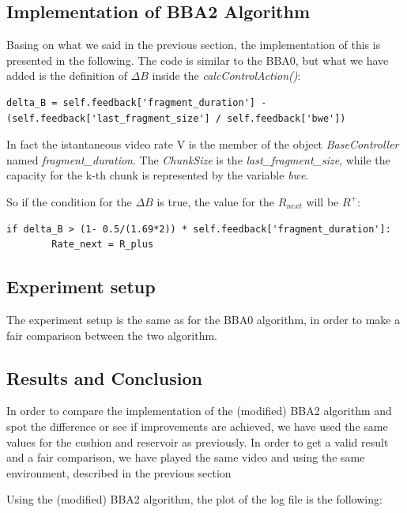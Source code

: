 \documentclass[a4paper]{report}
\begin{document}
\subsection{Implementation of BBA2 Algorithm}

Basing on what we said in the previous section, the implementation of this is presented in the following. 
The code is similar to the BBA0, but what we have added is the definition of $\Delta B$  inside the \textit{calcControlAction()}:

\begin{Verbatim}
delta_B = self.feedback['fragment_duration'] - (self.feedback['last_fragment_size'] / self.feedback['bwe'])
\end{Verbatim}

In fact the istantaneous video rate V is the member of the object \textit{BaseController} named \textit{fragment\_duration}. The \textit{ChunkSize} is the \textit{last\_fragment\_size}, while the capacity for the k-th chunk is represented by the variable \textit{bwe}.

So if the condition for the $\Delta B$ is true, the value for the $R_{next}$ will be $R^+$:

\begin{Verbatim}
if delta_B > (1- 0.5/(1.69*2)) * self.feedback['fragment_duration']:
	    Rate_next = R_plus
\end{Verbatim}

\subsection{Experiment setup}

The experiment setup is the same as for the BBA0 algorithm, in order to make a fair comparison between the two algorithm.

\subsection{Results and Conclusion}

In order to compare the implementation of the (modified) BBA2 algorithm and spot the difference or see if improvements are achieved, we have used the same values for the cushion and reservoir as previously.
In order to get a valid result and a fair comparison, we have played the same video and using the same environment, described in the previous section

Using the (modified) BBA2 algorithm, the plot of the log file is the following:
\end{document}
